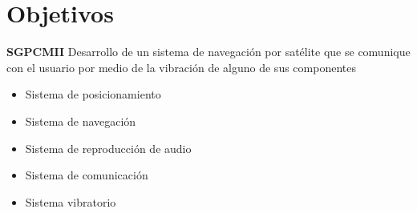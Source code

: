 \section{Objetivos}

\begin{slide}
  \begin{block}{\textbf{SGPCMII}}
    Desarrollo de un sistema de navegación por satélite que se comunique con el usuario por medio de
    la vibración de alguno de sus componentes
  \end{block}
  \begin{itemize}
    \item Sistema de posicionamiento
    \item Sistema de navegación
    \item Sistema de reproducción de audio
    \item Sistema de comunicación
    \item Sistema vibratorio
  \end{itemize}
\end{slide}

